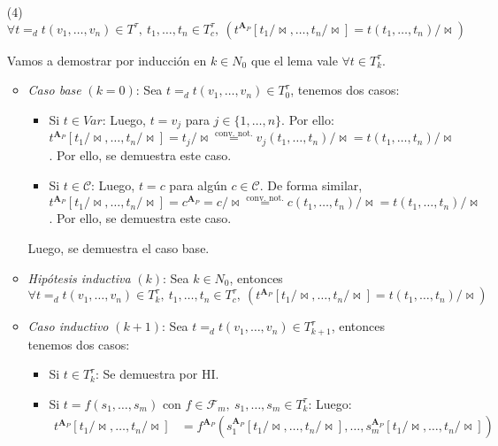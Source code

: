 \documentclass{article}
\begin{document}
\begin{enumerate}
  \item[(4)] $\forall t=_dt(v_1,\dots,v_n)\in T^\tau,\ t_1,\dots,t_n\in T^\tau_c,\ (t^{\mathbf{A}_P}[t_1/\!\bowtie,\dots,t_n/\!\bowtie]=t(t_1,\dots,t_n)/\!\bowtie)$

        \vspace{0.1cm}
        Vamos a demostrar por inducción en $k\in N_0$ que el lema vale $\forall t\in T^\tau_k$.
        \begin{itemize}
          \item \textit{Caso base} $(k=0)$: Sea $t=_dt(v_1,\dots,v_n)\in T^\tau_0$, tenemos dos casos:
                \begin{itemize}
                  \item Si $t\in Var$: Luego, $t=v_j$ para $j\in\{1,\dots,n\}$. Por ello: $t^{\mathbf{A}_P}[t_1/\!\bowtie,\dots,t_n/\!\bowtie]=t_j/\!\bowtie\overset{\text{conv. not.}}{=}v_j(t_1,\dots,t_n)/\!\bowtie=t(t_1,\dots,t_n)/\!\bowtie$. Por ello, se demuestra este caso.
                  \item Si $t\in\mathcal{C}$: Luego, $t=c$ para algún $c\in\mathcal{C}$. De forma similar, $t^{\mathbf{A}_P}[t_1/\!\bowtie,\dots,t_n/\!\bowtie]=c^{\mathbf{A}_P}=c/\!\bowtie\overset{\text{conv. not.}}{=}c(t_1,\dots,t_n)/\!\bowtie=t(t_1,\dots,t_n)/\!\bowtie$. Por ello, se demuestra este caso.
                \end{itemize}
                Luego, se demuestra el caso base.
          \item \textit{Hipótesis inductiva} $(k)$: Sea $k\in N_0$, entonces $\forall t=_d t(v_1,\dots,v_n)\in T^\tau_k,\ t_1,\dots,t_n\in T^\tau_c,\ (t^{\mathbf{A}_P}[t_1/\!\bowtie,\dots,t_n/\!\bowtie]=t(t_1,\dots,t_n)/\!\bowtie)$
          \item \textit{Caso inductivo} $(k+1)$: Sea $t=_dt(v_1,\dots,v_n)\in T^\tau_{k+1}$, entonces tenemos dos casos:
                \begin{itemize}
                  \item Si $t\in T^\tau_k$: Se demuestra por HI.
                  \item Si $t=f(s_1,\dots,s_m)$ con $f\in\mathcal{F}_m,\ s_1,\dots,s_m\in T^\tau_k$: Luego:
                        \begin{equation*}
                          \begin{alignedat}{2}
                            t^{\mathbf{A}_P}[t_1/\!\bowtie,\dots,t_n/\!\bowtie] & =f^{\mathbf{A}_P}(s_1^{\mathbf{A}_P}[t_1/\!\bowtie,\dots,t_n/\!\bowtie],\dots,s_m^{\mathbf{A}_P}[t_1/\!\bowtie,\dots,t_n/\!\bowtie]) &  & \qquad\text{}                         \\

\end{alignedat}
\end{equation*}
\end{itemize}
\end{itemize}
\end{enumerate}
\end{document}
